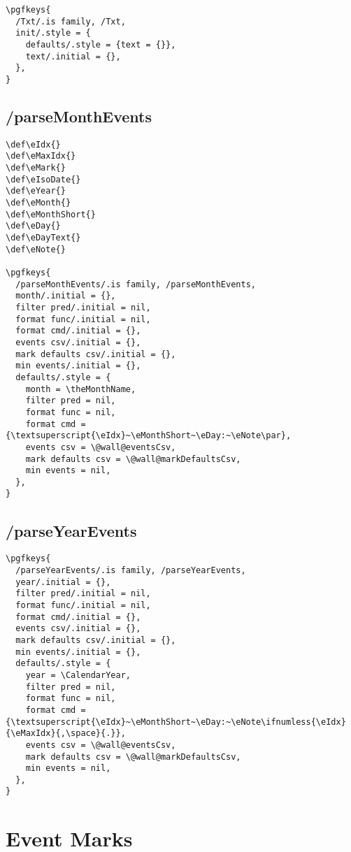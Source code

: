 \documentclass[11pt,oneside]{memoir-article}
\begin{document}
\begin{verbatim}
\pgfkeys{
  /Txt/.is family, /Txt,
  init/.style = {
    defaults/.style = {text = {}},
    text/.initial = {},
  },
}
\end{verbatim}

\section{/parseMonthEvents}
\label{sec:orgd004f9b}

\begin{verbatim}
\def\eIdx{}
\def\eMaxIdx{}
\def\eMark{}
\def\eIsoDate{}
\def\eYear{}
\def\eMonth{}
\def\eMonthShort{}
\def\eDay{}
\def\eDayText{}
\def\eNote{}

\pgfkeys{
  /parseMonthEvents/.is family, /parseMonthEvents,
  month/.initial = {},
  filter pred/.initial = nil,
  format func/.initial = nil,
  format cmd/.initial = {},
  events csv/.initial = {},
  mark defaults csv/.initial = {},
  min events/.initial = {},
  defaults/.style = {
    month = \theMonthName,
    filter pred = nil,
    format func = nil,
    format cmd = {\textsuperscript{\eIdx}~\eMonthShort~\eDay:~\eNote\par},
    events csv = \@wall@eventsCsv,
    mark defaults csv = \@wall@markDefaultsCsv,
    min events = nil,
  },
}
\end{verbatim}

\section{/parseYearEvents}
\label{sec:org4c5afb8}

\begin{verbatim}
\pgfkeys{
  /parseYearEvents/.is family, /parseYearEvents,
  year/.initial = {},
  filter pred/.initial = nil,
  format func/.initial = nil,
  format cmd/.initial = {},
  events csv/.initial = {},
  mark defaults csv/.initial = {},
  min events/.initial = {},
  defaults/.style = {
    year = \CalendarYear,
    filter pred = nil,
    format func = nil,
    format cmd = {\textsuperscript{\eIdx}~\eMonthShort~\eDay:~\eNote\ifnumless{\eIdx}{\eMaxIdx}{,\space}{.}},
    events csv = \@wall@eventsCsv,
    mark defaults csv = \@wall@markDefaultsCsv,
    min events = nil,
  },
}
\end{verbatim}

\chapter{Event Marks}
\label{sec:org60fda90}
\end{document}
